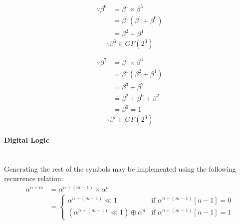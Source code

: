         \begin{minipage}[t]{0.5\textwidth}
            \begin{equation*}
                \begin{split}
                    \because \beta^{6} & = \beta^{1} \times \beta^{5} \\
                    & = \beta^{1} (\beta^{1}+\beta^{0}) \\
                    & = \beta^{2}+\beta^{1}
                \end{split}
            \end{equation*}
            \[ \therefore \beta^{6} \in GF(2^{3}) \]
        \end{minipage}
        \begin{minipage}[t]{0.5\textwidth}
            \begin{equation*}
                \begin{split}
                    \because \beta^{7} & = \beta^{1} \times \beta^{6} \\
                    & = \beta^{1} (\beta^{2}+\beta^{1}) \\
                    & = \beta^{3}+\beta^{2} \\
                    & = \beta^{2}+\beta^{0}+\beta^{2} \\
                    & = \beta^{0} = 1
                \end{split}
            \end{equation*}
            \[ \therefore \beta^{7} \in GF(2^{3}) \]
        \end{minipage}
        \newpage

        \paragraph{Digital Logic} \leavevmode \\ Generating the rest of the
        symbols may be implemented using the following recurrence relation:
        \begin{equation*}
            \begin{split}
                \alpha^{n+m} & =\alpha^{n+(m-1)}\times \alpha^{n} \\
                & = \begin{cases}
                        \alpha^{n+(m-1)} \ll 1 &
                        \text{if $\alpha^{n+(m-1)}[n-1] = 0$} \\
                        (\alpha^{n+(m-1)} \ll 1 ) \oplus \alpha^{n} &
                        \text{if $\alpha^{n+(m-1)}[n-1] = 1$}
                    \end{cases}
            \end{split}
        \end{equation*}

